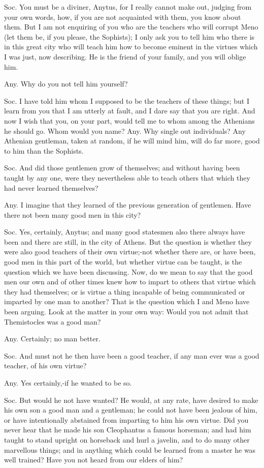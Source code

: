Soc. You must be a diviner, Anytus, for I really cannot make out,
judging from your own words, how, if you are not acquainted with them,
you know about them. But I am not enquiring of you who are the teachers
who will corrupt Meno (let them be, if you please, the Sophists);
I only ask you to tell him who there is in this great city who will
teach him how to become eminent in the virtues which I was just, now
describing. He is the friend of your family, and you will oblige him.

Any. Why do you not tell him yourself? 

Soc. I have told him whom I supposed to be the teachers of these things;
but I learn from you that I am utterly at fault, and I dare say that
you are right. And now I wish that you, on your part, would tell me
to whom among the Athenians he should go. Whom would you name? Any.
Why single out individuals? Any Athenian gentleman, taken at random,
if he will mind him, will do far more, good to him than the Sophists.

Soc. And did those gentlemen grow of themselves; and without having
been taught by any one, were they nevertheless able to teach others
that which they had never learned themselves? 

Any. I imagine that they learned of the previous generation of gentlemen.
Have there not been many good men in this city? 

Soc. Yes, certainly, Anytus; and many good statesmen also there always
have been and there are still, in the city of Athens. But the question
is whether they were also good teachers of their own virtue;-not whether
there are, or have been, good men in this part of the world, but whether
virtue can be taught, is the question which we have been discussing.
Now, do we mean to say that the good men our own and of other times
knew how to impart to others that virtue which they had themselves;
or is virtue a thing incapable of being communicated or imparted by
one man to another? That is the question which I and Meno have been
arguing. Look at the matter in your own way: Would you not admit that
Themistocles was a good man? 

Any. Certainly; no man better. 

Soc. And must not he then have been a good teacher, if any man ever
was a good teacher, of his own virtue? 

Any. Yes certainly,-if he wanted to be so. 

Soc. But would he not have wanted? He would, at any rate, have desired
to make his own son a good man and a gentleman; he could not have
been jealous of him, or have intentionally abstained from imparting
to him his own virtue. Did you never hear that he made his son Cleophantus
a famous horseman; and had him taught to stand upright on horseback
and hurl a javelin, and to do many other marvellous things; and in
anything which could be learned from a master he was well trained?
Have you not heard from our elders of him? 

